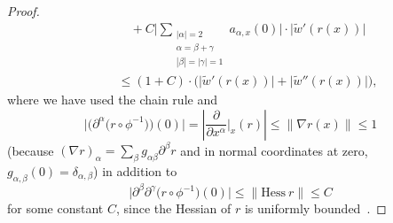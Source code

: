 \documentclass[pdftex]{sigma}
\numberwithin{equation}{section}
\newcommand{\norm}[1]{\lVert#1\rVert}
\begin{document}
\begin{proof}
\begin{align*}
&\qquad\quad{}+ C\bigg |\sum_{\substack{|\alpha|=2\\\alpha = \beta + \gamma\\|\beta|=|\gamma|= 1}} a_{\alpha,x}(0) \bigg|\cdot \big|\tilde{w}'(r(x))\big| \\
&\qquad {}\leq (1+C)\cdot\big( \big|\tilde{w}'(r(x))\big|+\big|\tilde{w}''(r(x))\big|\big),
\end{align*}
where we have used the chain rule and
\[
\big|\big(\partial^\alpha \bigl(r \circ \phi^{-1}\bigr)\big)(0)\big| = \left|\frac{\partial}{\partial x^\alpha}\bigg|_x (r)\right| \leq \norm{\nabla r(x)} \leq 1
\]
\big(because $(\nabla r)_\alpha = \sum_{\beta}g_{\alpha \beta} \partial^\beta r$ and in normal coordinates at zero, $g_{\alpha,\beta}(0) = \delta_{\alpha,\beta}$\big)
in addition to
\[
\big|\partial^\beta \partial^\gamma \big(r \circ \phi^{-1}\big)(0)\big| \leq \| \mathrm{Hess}\ r \| \leq C
\]
for some constant $C$, since the Hessian of $r$ is uniformly bounded~\cite[Theorem~6.5.27]{Petersen2006}.


\end{proof}
\end{document}
